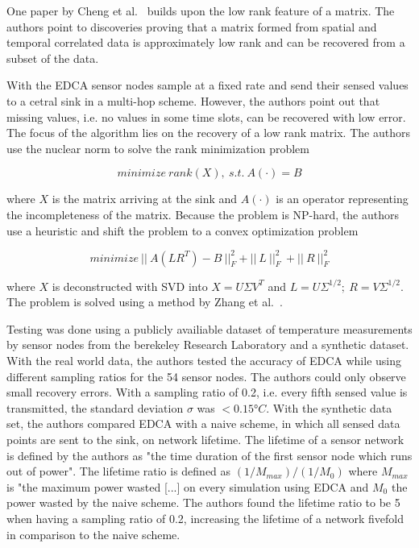 \par

One paper by Cheng et al.~\cite{cheng2010efficient} builds upon the low rank
feature of a matrix. The authors point to discoveries proving that a matrix
formed from spatial and temporal correlated data is approximately low rank and
can be recovered from a subset of the data. %

With the \ac{EDCA} sensor nodes sample at a fixed rate and send their sensed
values to a cetral sink in a multi-hop scheme. However, the authors point out
that missing values, i.e. no values in some time slots, can be recovered with
low error. The focus of the algorithm lies on the recovery of a low rank
matrix. The authors use the nuclear norm to solve the rank minimization problem

$$
minimize \ rank(X), \ s.t. \ A(\cdot)=B
$$

where $ X $ is the matrix arriving at the sink and $ A(\cdot) $ is an operator
representing the incompleteness of the matrix. Because the problem is NP-hard,
the authors use a heuristic and shift the problem to a convex optimization
problem

$$
minimize \ || \ A(LR^T) - B \ ||^2_F + || \ L \ ||^2_F \ + || \ R \ ||^2_F
$$

where $ X $ is deconstructed with \ac{SVD} into $ X = U \Sigma V^T $ and $ L =
U\Sigma^{1/2}; \ R = V\Sigma^{1/2}$. The problem is solved using a method by
Zhang et al.~\cite{zhang2009spatio}.

Testing was done using a publicly availiable dataset of temperature
measurements by sensor nodes from the berekeley Research Laboratory and a
synthetic dataset. With the real world data, the authors tested the accuracy of
\ac{EDCA} while using different sampling ratios for the 54 sensor nodes. The
authors could only observe small recovery errors. With a sampling ratio of 0.2,
i.e. every fifth sensed value is transmitted, the standard deviation $ \sigma $
was $ < 0.15°C $. %
With the synthetic data set, the authors compared \ac{EDCA}
with a naive scheme, in which all sensed data points are sent to the sink, on
network lifetime. The lifetime of a sensor network is defined by the authors as
"the time duration of the first sensor node which runs out of power". The
lifetime ratio is defined as $ (1/M_{max}) / (1/M_0) $ where $ M_{max} $ is
"the maximum power wasted [...] on every simulation using \ac{EDCA} and $ M_0 $
the power wasted by the naive scheme. The authors found the lifetime ratio to
be 5 when having a sampling ratio of 0.2, increasing the lifetime of a network
fivefold in comparison to the naive scheme.


